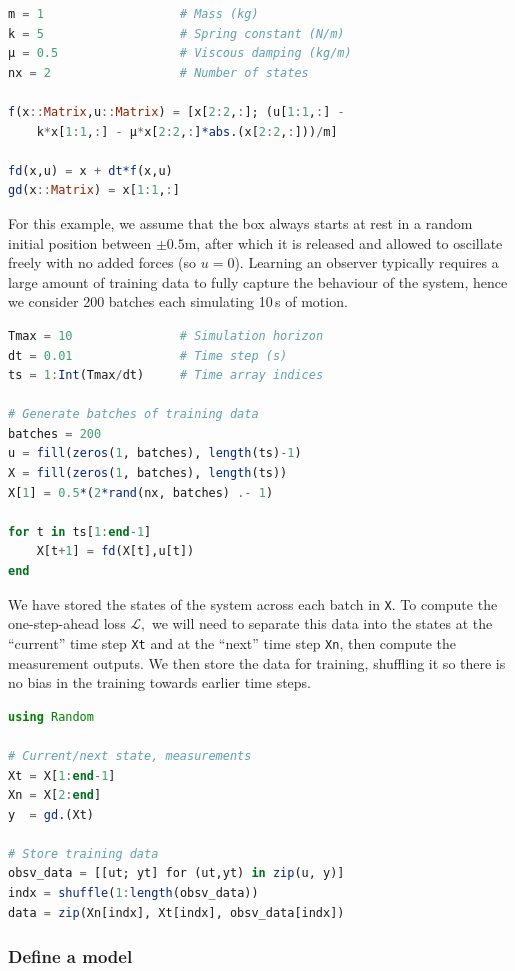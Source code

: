 \begin{lstlisting}[language = Julia]
m = 1                   # Mass (kg)
k = 5                   # Spring constant (N/m)
μ = 0.5                 # Viscous damping (kg/m)
nx = 2                  # Number of states

f(x::Matrix,u::Matrix) = [x[2:2,:]; (u[1:1,:] - 
    k*x[1:1,:] - μ*x[2:2,:]*abs.(x[2:2,:]))/m]

fd(x,u) = x + dt*f(x,u)
gd(x::Matrix) = x[1:1,:]
\end{lstlisting}

For this example, we assume that the box always starts at rest in a random initial position between $\pm0.5$m, after which it is released and allowed to oscillate freely with no added forces (so $u = 0$). Learning an observer typically requires a large amount of training data to fully capture the behaviour of the system, hence we consider 200 batches each simulating 10\,s of motion.
\begin{lstlisting}[language = Julia]
Tmax = 10               # Simulation horizon
dt = 0.01               # Time step (s)
ts = 1:Int(Tmax/dt)     # Time array indices

# Generate batches of training data
batches = 200
u = fill(zeros(1, batches), length(ts)-1)
X = fill(zeros(1, batches), length(ts))
X[1] = 0.5*(2*rand(nx, batches) .- 1)

for t in ts[1:end-1]
    X[t+1] = fd(X[t],u[t])
end
\end{lstlisting}
We have stored the states of the system across each batch in \verb|X|. To compute the one-step-ahead loss $\mathcal{L},$ we will need to separate this data into the states at the ``current'' time step \verb|Xt| and at the ``next'' time step \verb|Xn|, then compute the measurement outputs. We then store the data for training, shuffling it so there is no bias in the training towards earlier time steps.
\begin{lstlisting}[language = Julia]
using Random

# Current/next state, measurements
Xt = X[1:end-1]
Xn = X[2:end]
y  = gd.(Xt)

# Store training data
obsv_data = [[ut; yt] for (ut,yt) in zip(u, y)]
indx = shuffle(1:length(obsv_data))
data = zip(Xn[indx], Xt[indx], obsv_data[indx])
\end{lstlisting}

\subsubsection{Define a model} \label{sec:observer-model}

